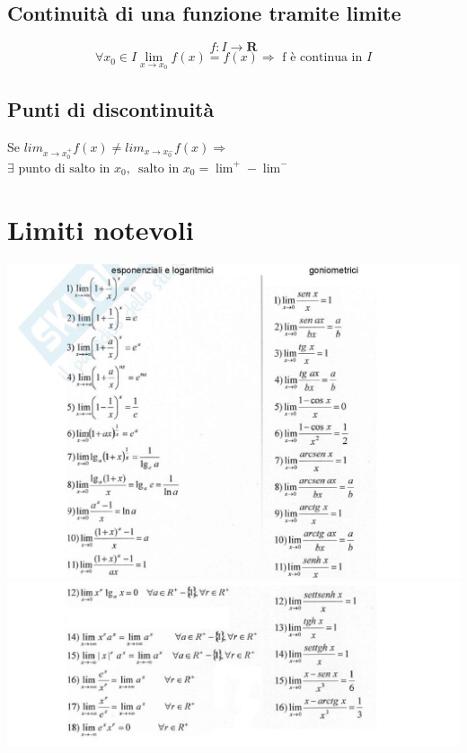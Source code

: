 \documentclass{report}
\begin{document}
    \subsection{Continuità di una funzione tramite limite}
        $$f: I \longrightarrow \mathbf{R}$$
        $$\forall x_0 \in I \lim_{x \to x_0} f\left(x\right) = f\left(x\right) \Longrightarrow \textrm{ f è continua in }I$$
    \subsection{Punti di discontinuità}
        Se $lim_{x \to x_0^+} f\left(x\right) \neq lim_{x \to x_0^-} f\left(x\right) \Longrightarrow$ \\
        $\exists \textrm{ punto di salto in } x_0, \, \textrm{ salto in }x_0 = \lim^+ - \lim^-$
\newpage
\section{Limiti notevoli}
    \begin{center}
        \hspace*{-1.85in}
        \includegraphics[width=2\textwidth]{limiti-notevoli1.jpg}
        \hspace*{-1.85in}
        \includegraphics[width=2\textwidth]{limiti-notevoli2.jpg}
    \end{center}
\end{document}
